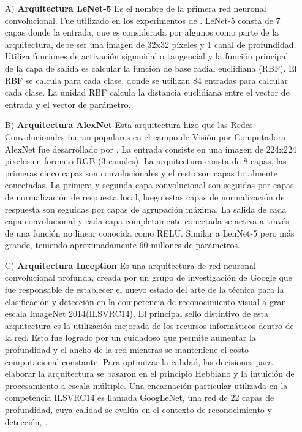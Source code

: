 		\vskip 0.1cm	
		\begin{enumerate}
		\item[A)] {\bf  Arquitectura LeNet-5}  \vskip 0.2cm
			Es el nombre de la primera red neuronal convolucional. Fue utilizado en los experimentos de \citep{LeCun}. LeNet-5 consta de 7 capas donde la entrada, que es considerada por algunos como parte de la arquitectura, debe ser una imagen de 32x32 píxeles y 1 canal de profundidad. Utiliza funciones de activación sigmoidal o tangencial y la función principal de la capa de salida es calcular la función de base radial euclidiana (RBF). El RBF se calcula para cada clase, donde se utilizan 84 entradas para calcular cada clase. La unidad RBF calcula la distancia euclidiana entre el vector de entrada y el vector de parámetro. 
		
		\item[B)] {\bf Arquitectura AlexNet}  \vskip 0.2cm
			Esta arquitectura hizo que las Redes Convolucionales fueran populares en el campo de Visión por Computadora. AlexNet fue desarrollado por \citep{Krizhevsky2012}. La entrada consiste en una imagen de 224x224 pixeles en formato RGB (3 canales). La arquitectura consta de 8 capas, las primeras cinco capas son convolucionales y el resto son capas totalmente conectadas. La primera y segunda capa convolucional son seguidas por capas de normalización de respuesta local, luego estas capas de normalización de respuesta son seguidas por capas de agrupación máxima. La salida de cada capa convolucional y cada capa completamente conectada se activa a través de  una función no linear conocida como RELU. Similar a LenNet-5 pero más grande, teniendo aproximadamente 60 millones de parámetros.

		\item[C)] {\bf Arquitectura Inception}  \vskip 0.2cm
			Es una arquitectura de red neuronal convolucional profunda, creada por un grupo de investigación de Google que fue responsable de establecer el nuevo estado del arte de la técnica para la clasificación y detección en la competencia de reconocimiento visual a gran escala ImageNet 2014(ILSVRC14). 
			\vskip 0.1cm
			El principal sello distintivo de esta arquitectura es la utilización mejorada de los recursos informáticos dentro de la red. Esto fue logrado por un cuidadoso que permite aumentar la profundidad y el ancho de la red mientras se manteniene el costo computacional constante. Para optimizar la calidad, las decisiones para elaborar la arquitectura se basaron en el principio Hebbiano y la intuición de procesamiento a escala múltiple. Una encarnación particular utilizada en la competencia ILSVRC14 es llamada GoogLeNet, una red de 22 capas de profundidad, cuya calidad se evalúa en el contexto de reconocimiento y detección, \citep{Inception}.
		\end{enumerate}
		
